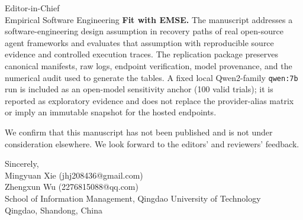 \documentclass[10pt]{letter}
\begin{document}
\begin{letter}{Editor-in-Chief\\
Empirical Software Engineering}
\textbf{Fit with EMSE.}
The manuscript addresses a software-engineering design assumption in recovery
paths of real open-source agent frameworks and evaluates that assumption with
reproducible source evidence and controlled execution traces.  The replication
package preserves canonical manifests, raw logs, endpoint verification, model
provenance, and the numerical audit used to generate the tables.  A fixed local
Qwen2-family \texttt{qwen:7b} run is included as an open-model sensitivity
anchor (100 valid trials); it is reported as exploratory evidence and does not
replace the provider-alias matrix or imply an immutable snapshot for the hosted
endpoints.

We confirm that this manuscript has not been published and is not under
consideration elsewhere.  We look forward to the editors' and reviewers'
feedback.

\closing{Sincerely,\\[1em]
Mingyuan Xie (jhj208436@gmail.com)\\
Zhengxun Wu (2276815088@qq.com)\\
School of Information Management, Qingdao University of Technology\\
Qingdao, Shandong, China}

\end{letter}
\end{document}
